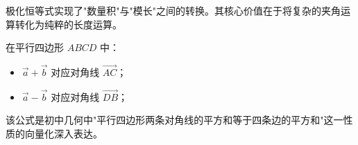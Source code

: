\begin{explanationbox}
极化恒等式实现了"数量积"与"模长"之间的转换。其核心价值在于将复杂的夹角运算转化为纯粹的长度运算。

在平行四边形 $ABCD$ 中：
\begin{itemize}
    \item $\vec{a} + \vec{b}$ 对应对角线 $\vec{AC}$；
    \item $\vec{a} - \vec{b}$ 对应对角线 $\vec{DB}$；
\end{itemize}
该公式是初中几何中"平行四边形两条对角线的平方和等于四条边的平方和"这一性质的向量化深入表达。
\end{explanationbox}